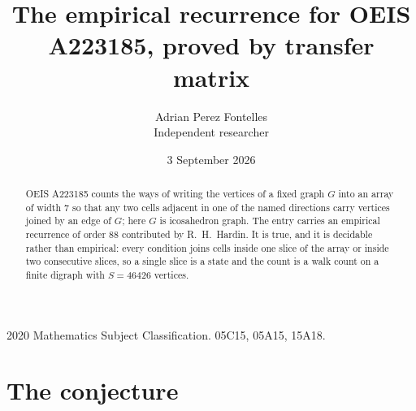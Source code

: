\documentclass[11pt,a4paper]{article}
\title{The empirical recurrence for OEIS A223185, proved by transfer matrix}
\author{Adrian Perez Fontelles\\ \small Independent researcher}
\date{3 September 2026}
\theoremstyle{plain}
\theoremstyle{definition}
\begin{document}
\maketitle

\begin{abstract}
OEIS A223185 counts the ways of writing the vertices of a fixed graph $G$ into an array of width
$7$ so that any two cells adjacent in one of the named directions carry vertices joined by an
edge of $G$; here $G$ is icosahedron graph. The entry carries an empirical recurrence of order $88$
contributed by R.~H.~Hardin. It is true, and it is decidable rather than empirical: every
condition joins cells inside one slice of the array or inside two consecutive slices, so a
single slice is a state and the count is a walk count on a finite digraph with $S=46426$ vertices.
\end{abstract}

\noindent\small 2020 Mathematics Subject Classification. 05C15, 05A15, 15A18.\normalsize

\section{The conjecture}
\end{document}
